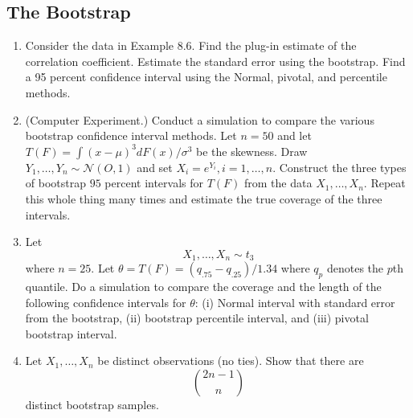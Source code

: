 \documentclass{article}
\begin{document}
\subsection{The Bootstrap}
\begin{enumerate}
	\item Consider the data in Example 8.6. Find the plug-in estimate of the correlation coefficient. Estimate the standard error using the bootstrap. Find a 95 percent confidence interval using the Normal, pivotal, and percentile methods.
	\item (Computer Experiment.) Conduct a simulation to compare the various bootstrap confidence interval methods. Let $n = 50$ and let $T(F) = \int(x - \mu)^3 dF(x)/\sigma^3$ be the skewness. Draw $Y_1, \dots, Y_n \sim \mathcal{N}(O,1)$ and set $X_i = e^{Y_i}, i = 1, \dots, n$. Construct the three types of bootstrap $95$ percent intervals for $T(F)$ from the data $X_1, \dots, X_n$. Repeat this whole thing many times and estimate the true coverage of the three intervals.
	\item Let
	$$
	X_1, \dots, X_n \sim t_3
	$$
	where $n = 25$. Let $\theta = T(F) = (q_{.75} - q_{.25}) / 1.34$ where $q_p$ denotes the $p$th quantile. Do a simulation to compare the coverage and the length of the following confidence intervals for $\theta$: (i) Normal interval with standard error from the bootstrap, (ii) bootstrap percentile interval, and (iii) pivotal bootstrap interval.
	\item Let $X_1, \dots, X_n$ be distinct observations (no ties). Show that there are
	$$
	\binom{2n - 1}{n}
	$$
	distinct bootstrap samples.


\end{enumerate}
\end{document}
